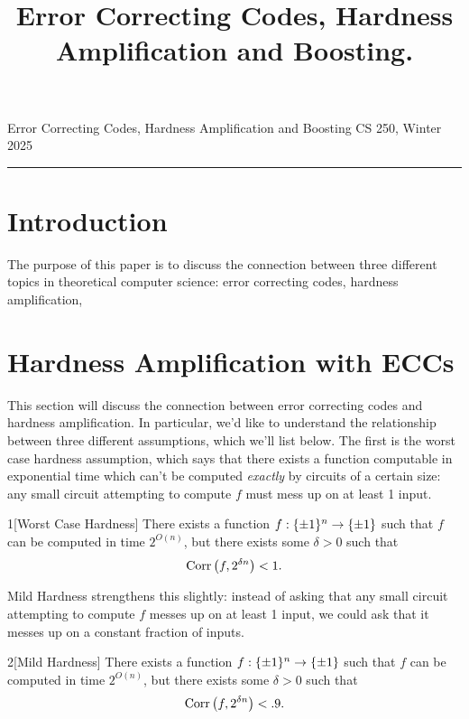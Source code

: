 \documentclass[11pt]{article}
\title{Error Correcting Codes, Hardness Amplification and Boosting.}
\date{}
\begin{document}
    
\noindent Error Correcting Codes, Hardness Amplification and Boosting \hfill  CS 250, Winter 2025\\
\hrule


\section{Introduction}

The purpose of this paper is to discuss the connection between three different topics in theoretical computer science: error correcting codes, hardness amplification,


\section{Hardness Amplification with ECCs}

This section will discuss the connection between error correcting codes and hardness amplification. In particular, we'd like to understand the relationship between three different assumptions, which we'll list below. The first is the worst case hardness assumption, which says that there exists a function computable in exponential time which can't be computed \emph{exactly} by circuits of a certain size: any small circuit attempting to compute $f$ must mess up on at least 1 input.

\begin{assumption}{1}[Worst Case Hardness] \label{a-1}
    There exists a function $f : \{\pm 1\}^n \rightarrow \{\pm 1\}$ such that $f$ can be computed in time $2^{O(n)}$, but there exists some $\delta > 0$ such that 
    \begin{equation*}
        \mathrm{Corr}\left(f, 2^{\delta n}\right) < 1.
    \end{equation*}
\end{assumption}

Mild Hardness strengthens this slightly: instead of asking that any small circuit attempting to compute $f$ messes up on at least 1 input, we could ask that it messes up on a constant fraction of inputs.

\begin{assumption}{2}[Mild Hardness] \label{a-2}
    There exists a function $f : \{\pm 1\}^n \rightarrow \{\pm 1\}$ such that $f$ can be computed in time $2^{O(n)}$, but there exists some $\delta > 0$ such that 
    \begin{equation*}
        \mathrm{Corr}\left(f, 2^{\delta n}\right) < .9.
    \end{equation*}
\end{assumption}
\end{document}
